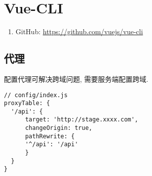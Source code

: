 \section{Vue-CLI}\label{vue-cli}

\begin{enumerate}
\def\labelenumi{\arabic{enumi}.}
\tightlist
\item
  GitHub: \url{https://github.com/vuejs/vue-cli}
\end{enumerate}

\subsection{代理}\label{ux4ee3ux7406}

配置代理可解决跨域问题, 需要服务端配置跨域.

\begin{lstlisting}
// config/index.js
proxyTable: {
  '/api': {
      target: 'http://stage.xxxx.com',
      changeOrigin: true,
      pathRewrite: {
      '^/api': '/api'
      }
  }
}
\end{lstlisting}

